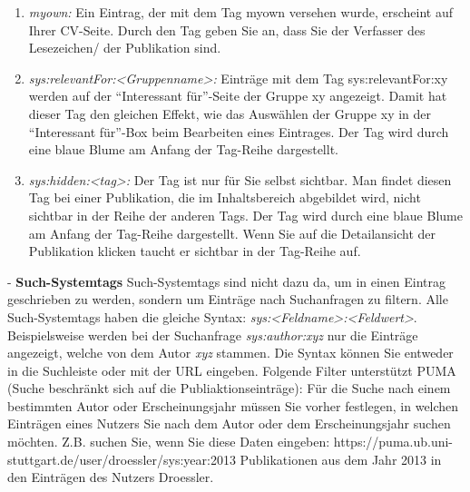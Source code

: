 \documentclass[a4paper,11pt,twoside]{scrbook}
\begin{document}
\begin{enumerate}
    \item \textit{myown:} Ein Eintrag, der mit dem Tag myown versehen wurde, erscheint auf Ihrer CV-Seite. Durch den Tag geben Sie an, dass Sie der Verfasser des Lesezeichen/ der Publikation sind.
    \item \textit{sys:relevantFor:<Gruppenname>:} Einträge mit dem Tag sys:relevantFor:xy werden auf der \enquote{Interessant für}-Seite der Gruppe xy angezeigt. Damit hat dieser Tag den gleichen Effekt, wie das  Auswählen der Gruppe xy in der \enquote{Interessant für}-Box beim Bearbeiten eines Eintrages. Der Tag wird durch eine blaue Blume am Anfang der Tag-Reihe dargestellt. 
    \item \textit{sys:hidden:<tag>:} Der Tag ist nur für Sie selbst sichtbar. Man findet diesen Tag bei einer Publikation, die im Inhaltsbereich abgebildet wird, nicht sichtbar in der Reihe der anderen Tags. Der Tag wird durch eine blaue Blume am Anfang der Tag-Reihe dargestellt. Wenn Sie auf die Detailansicht der Publikation klicken taucht er sichtbar in der Tag-Reihe auf.
\end{enumerate}
- \textbf{Such-Systemtags}\newline
Such-Systemtags sind nicht dazu da, um in einen Eintrag geschrieben zu werden, sondern um Einträge nach Suchanfragen zu filtern. Alle Such-Systemtags haben die gleiche Syntax: \textit{sys:<Feldname>:<Feldwert>}. Beispielsweise werden  bei der Suchanfrage \textit{sys:author:xyz} nur die Einträge angezeigt, welche von dem Autor \textit{xyz} stammen.\newline
Die Syntax können Sie entweder in die Suchleiste oder mit der URL eingeben. Folgende Filter unterstützt PUMA (Suche beschränkt sich auf die Publiaktionseinträge):\newline
\newline
Für die Suche nach einem bestimmten Autor oder Erscheinungsjahr müssen Sie vorher festlegen, in welchen Einträgen eines Nutzers Sie nach dem Autor oder dem Erscheinungsjahr suchen möchten. Z.B. suchen Sie, wenn Sie diese Daten eingeben:  https://puma.ub.uni-stuttgart.de/user/droessler/sys:year:2013  Publikationen aus dem Jahr 2013 in den Einträgen des Nutzers Droessler. 
\end{document}
